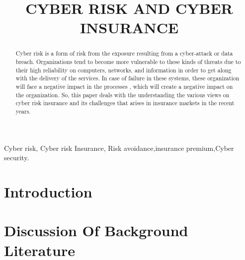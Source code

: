 \documentclass[conference]{IEEEtran}
\begin{document}
\title{CYBER RISK AND CYBER INSURANCE\\}

\author{
\and
{}
}


\maketitle

\begin{abstract}
Cyber risk is a form of risk from the exposure resulting from a cyber-attack or data breach. Organizations tend to become more vulnerable to these kinds of threats due to their high reliability on computers, networks, and information in order to get along with the delivery of the services. In case of failure in these systems, these organization will face a negative impact in the processes , which will create a negative impact on the organization. So, this paper deals with the understanding the various views on cyber risk insurance and its challenges that arises in insurance markets in the recent years.   
\end{abstract}

\begin{IEEEkeywords}
Cyber risk, Cyber risk Insurance, Risk avoidance,insurance premium,Cyber security.
\end{IEEEkeywords}
\section{Introduction}

\section{Discussion Of Background Literature}
\end{document}
